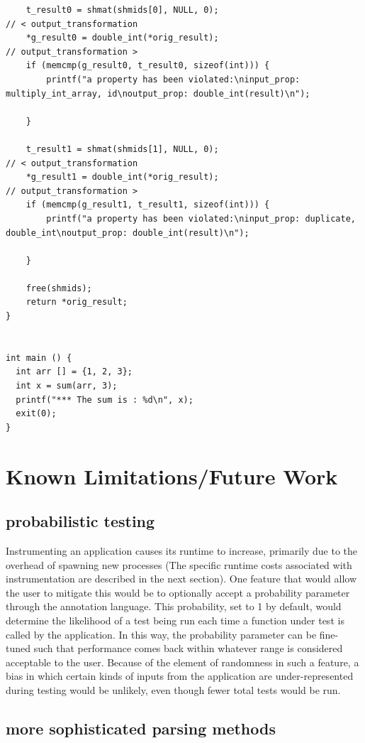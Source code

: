 \documentclass[notitlepage]{article}
\begin{document}
\begin{verbatim}
    t_result0 = shmat(shmids[0], NULL, 0);
// < output_transformation
    *g_result0 = double_int(*orig_result);
// output_transformation >
    if (memcmp(g_result0, t_result0, sizeof(int))) {
        printf("a property has been violated:\ninput_prop: multiply_int_array, id\noutput_prop: double_int(result)\n");

    }

    t_result1 = shmat(shmids[1], NULL, 0);
// < output_transformation
    *g_result1 = double_int(*orig_result);
// output_transformation >
    if (memcmp(g_result1, t_result1, sizeof(int))) {
        printf("a property has been violated:\ninput_prop: duplicate, double_int\noutput_prop: double_int(result)\n");

    }

    free(shmids);
    return *orig_result;
}


int main () {
  int arr [] = {1, 2, 3};
  int x = sum(arr, 3);
  printf("*** The sum is : %d\n", x);
  exit(0);
}
\end{verbatim}

\section{Known Limitations/Future Work}

\subsection{probabilistic testing}

Instrumenting an application causes its runtime to increase, primarily due to the overhead of spawning new processes (The specific runtime costs associated with instrumentation are described in the next section). One feature that would allow the user to mitigate this would be to optionally accept a probability parameter through the annotation language. This probability, set to 1 by default, would determine the likelihood of a test being run each time a function under test is called by the application. In this way, the probability parameter can be fine-tuned such that performance comes back within whatever range is considered acceptable to the user. Because of the element of randomness in such a feature, a bias in which certain kinds of inputs from the application are under-represented during testing would be unlikely, even though fewer total tests would be run.

\subsection{more sophisticated parsing methods}
\end{document}
